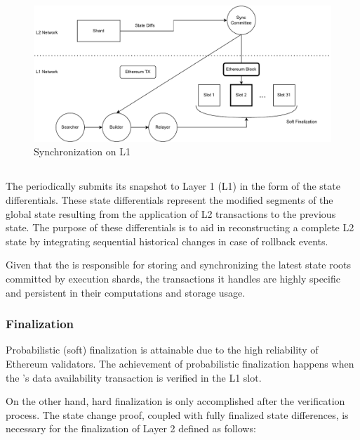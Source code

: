 \begin{figure}[h]
    \centering
	\includegraphics[scale=0.65]{figures/soft-finalization.pdf}
    \caption{Synchronization on L1}
     \label{figure:soft-finality}
\end{figure}


\subsection{\mainshard}

The \mainshard periodically submits its snapshot to Layer 1 (L1) in the form of the state 
differentials. These state differentials represent the modified segments of the global state 
resulting from the application of L2 transactions to the previous state. The purpose of these 
differentials is to aid in reconstructing a complete L2 state by integrating sequential historical 
changes in case of rollback events.

Given that the \mainshard is responsible for storing and synchronizing the latest state roots 
committed by execution shards, the transactions it handles are highly specific and persistent 
in their computations and storage usage.


\subsubsection{Finalization}

Probabilistic (soft) finalization is attainable due to the high reliability of Ethereum validators. 
The achievement of probabilistic finalization happens when the \mainshard's data availability 
transaction is verified in the L1 slot.

On the other hand, hard finalization is only accomplished after the verification process. 
The state change proof, coupled with fully finalized state differences, is necessary for the 
finalization of Layer 2 defined as follows:

